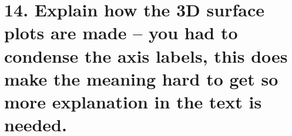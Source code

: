 \documentclass[12pt]{article}
\begin{document}
\section*{14.
Explain how the 3D surface plots are made --
you had to condense the axis labels, this 
does make the meaning hard to get 
so more explanation in the text is needed.
}


%
%
%
\end{document}
